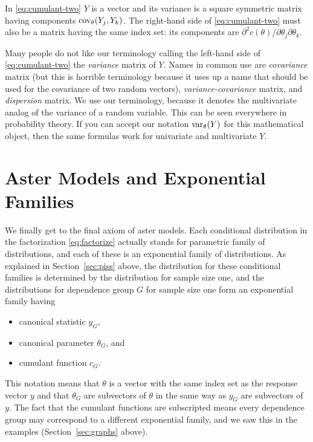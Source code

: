 In \eqref{eq:cumulant-two} $Y$ is a vector and its variance is a square
symmetric matrix having components $\operatorname{cov}_\theta(Y_j, Y_k)$.
The right-hand side of \eqref{eq:cumulant-two} must also be a matrix having
the same index set: its components are
$\partial^2 c(\theta) / \partial \theta_j \partial \theta_k$.

Many people do not like our terminology calling the left-hand side
of \eqref{eq:cumulant-two} the \emph{variance} matrix of $Y$.
Names in common use are \emph{covariance} matrix (but this is horrible
terminology because it uses up a name that should be used for the covariance
of two random vectors), \emph{variance-covariance} matrix,
and \emph{dispersion} matrix.
We use our terminology, because it denotes the multivariate analog
of the variance of a random variable.
This can be seen everywhere in probability theory.
If you can accept our notation $\operatorname{var}_\theta(Y)$ for this mathematical
object, then the same formulas work for univariate and multivariate $Y$.

\section{Aster Models and Exponential Families}
\label{sec:aster-expfam}

We finally get to the final axiom of aster models.
Each conditional distribution in the factorization \eqref{eq:factorize}
actually stands for parametric family of distributions,
and each of these is an exponential family of distributions.
As explained in Section~\ref{sec:piss} above,
the distribution for these conditional families is determined
by the distribution for sample size one, and the distributions
for dependence group $G$ for sample size one form an exponential family having
\begin{itemize}
\item canonical statistic $y_G$,
\item canonical parameter $\theta_G$, and
\item cumulant function $c_G$.
\end{itemize}
This notation means that $\theta$ is a vector with the same index set as
the response vector $y$ and that $\theta_G$ are subvectors of $\theta$
in the same way as $y_G$ are subvectors of $y$.
The fact that the cumulant functions are subscripted means every
dependence group may correspond to a different exponential family,
and we saw this in the examples (Section~\ref{sec:graphs} above).

